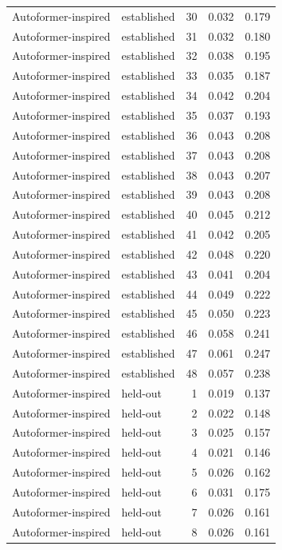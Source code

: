 \begin{tabular}{llrrr}
Autoformer-inspired & established & 30 & 0.032 & 0.179 \\
Autoformer-inspired & established & 31 & 0.032 & 0.180 \\
Autoformer-inspired & established & 32 & 0.038 & 0.195 \\
Autoformer-inspired & established & 33 & 0.035 & 0.187 \\
Autoformer-inspired & established & 34 & 0.042 & 0.204 \\
Autoformer-inspired & established & 35 & 0.037 & 0.193 \\
Autoformer-inspired & established & 36 & 0.043 & 0.208 \\
Autoformer-inspired & established & 37 & 0.043 & 0.208 \\
Autoformer-inspired & established & 38 & 0.043 & 0.207 \\
Autoformer-inspired & established & 39 & 0.043 & 0.208 \\
Autoformer-inspired & established & 40 & 0.045 & 0.212 \\
Autoformer-inspired & established & 41 & 0.042 & 0.205 \\
Autoformer-inspired & established & 42 & 0.048 & 0.220 \\
Autoformer-inspired & established & 43 & 0.041 & 0.204 \\
Autoformer-inspired & established & 44 & 0.049 & 0.222 \\
Autoformer-inspired & established & 45 & 0.050 & 0.223 \\
Autoformer-inspired & established & 46 & 0.058 & 0.241 \\
Autoformer-inspired & established & 47 & 0.061 & 0.247 \\
Autoformer-inspired & established & 48 & 0.057 & 0.238 \\
Autoformer-inspired & held-out & 1 & 0.019 & 0.137 \\
Autoformer-inspired & held-out & 2 & 0.022 & 0.148 \\
Autoformer-inspired & held-out & 3 & 0.025 & 0.157 \\
Autoformer-inspired & held-out & 4 & 0.021 & 0.146 \\
Autoformer-inspired & held-out & 5 & 0.026 & 0.162 \\
Autoformer-inspired & held-out & 6 & 0.031 & 0.175 \\
Autoformer-inspired & held-out & 7 & 0.026 & 0.161 \\
Autoformer-inspired & held-out & 8 & 0.026 & 0.161 \\

\end{tabular}
